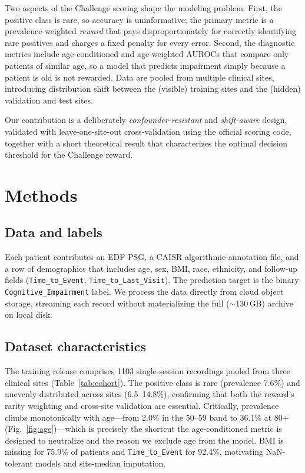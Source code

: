 \documentclass{cinc}
\begin{document}
Two aspects of the Challenge scoring shape the modeling problem. First, the
positive class is rare, so accuracy is uninformative; the primary metric is a
prevalence-weighted \emph{reward} that pays disproportionately for correctly
identifying rare positives and charges a fixed penalty for every error.
Second, the diagnostic metrics include age-conditioned and age-weighted
AUROCs that compare only patients of similar age, so a model that
predicts impairment simply because a patient is old is not rewarded. Data are
pooled from multiple clinical sites, introducing distribution shift between
the (visible) training sites and the (hidden) validation and test sites.

Our contribution is a deliberately \emph{confounder-resistant} and
\emph{shift-aware} design, validated with leave-one-site-out cross-validation
using the official scoring code, together with a short theoretical result
that characterizes the optimal decision threshold for the Challenge reward.

\section{Methods}

\subsection{Data and labels}
Each patient contributes an EDF PSG, a CAISR algorithmic-annotation file, and
a row of demographics that includes age, sex, BMI, race, ethnicity, and
follow-up fields (\texttt{Time\_to\_Event}, \texttt{Time\_to\_Last\_Visit}).
The prediction target is the binary \texttt{Cognitive\_Impairment} label.
We process the data directly from cloud object storage, streaming each record
without materializing the full ($\sim$130\,GB) archive on local disk.

\subsection{Dataset characteristics}
\label{sec:data}
The training release comprises 1103 single-session recordings pooled from three
clinical sites (Table~\ref{tab:cohort}). The positive class is rare
(prevalence 7.6\%) and unevenly distributed across sites (6.5--14.8\%),
confirming that both the reward's rarity weighting and cross-site validation are
essential. Critically, prevalence climbs monotonically with age---from 2.0\% in
the 50--59 band to 36.1\% at 80+ (Fig.~\ref{fig:age})---which is precisely the
shortcut the age-conditioned metric is designed to neutralize and the reason we
exclude age from the model. BMI is missing for 75.9\% of patients and
\texttt{Time\_to\_Event} for 92.4\%, motivating NaN-tolerant models and
site-median imputation.
\end{document}
